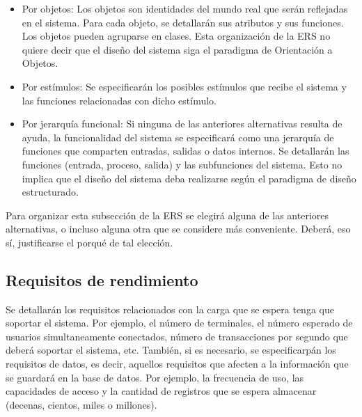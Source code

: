 \documentclass[12pt,a4paper, twosite]{article}
\begin{document}
\begin{itemize}
\item Por objetos:
   Los objetos son identidades del mundo real que serán reflejadas en
el sistema. Para cada objeto, se detallarán sus atributos y sus
funciones. Los objetos pueden agruparse en clases. Esta organización
de la ERS no quiere decir que el diseño del sistema siga el
paradigma de Orientación a Objetos.
\end{itemize}


\begin{itemize}
\item Por estímulos: 
  Se especificarán los posibles estímulos que recibe el sistema y las
funciones relacionadas con dicho estímulo.
\end{itemize}


\begin{itemize}
\item Por jerarquía funcional: 
   Si ninguna de las anteriores alternativas resulta de ayuda, la
funcionalidad del sistema se especificará como una jerarquía de
funciones que comparten entradas, salidas o datos internos. Se
detallarán las funciones (entrada, proceso, salida) y las
subfunciones del sistema. Esto no implica que el diseño del sistema
deba realizarse según el paradigma de diseño estructurado.
\end{itemize}


Para organizar esta subsección de la ERS se elegirá alguna de las
anteriores alternativas, o incluso alguna otra que se considere más
conveniente. Deberá, eso sí, justificarse el porqué de tal elección.



\subsection{Requisitos de rendimiento}
\label{sec:org94bc543}

Se detallarán los requisitos relacionados con la carga que se espera
tenga que soportar el sistema. Por ejemplo, el número de terminales,
el número esperado de usuarios simultaneamente conectados, número de
transacciones por segundo que deberá soportar el sistema, etc.
  También, si es necesario, se especificarpán los requisitos de
datos, es decir, aquellos requisitos que afecten a la información
que se guardará en la base de datos. Por ejemplo, la frecuencia de
uso, las capacidades de acceso y la cantidad de registros que se
espera almacenar (decenas, cientos, miles o millones).
\end{document}
